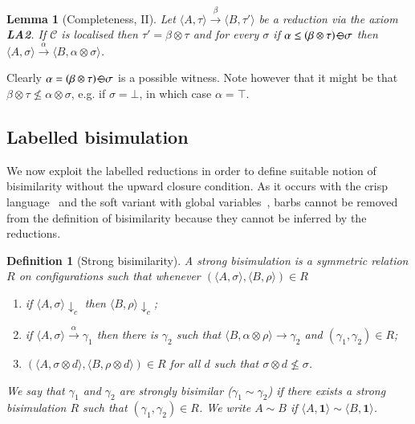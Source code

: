 \documentclass[preprint,12pt]{elsarticle}
\newtheorem{definition}{Definition}
\newtheorem{lemma}{Lemma}
\def\C{{\mathcal C}}
\def\monid{{\mathbf 0}}
\def\C{{\mathcal C}}
\def\odiv{\, {\ominus\hspace{-7.7pt} \div} \,}
\def\monid{\mathbf{1}}
\begin{document}
\begin{lemma}[Completeness, II]
	\label{LA2}
	Let $\langle A, \tau \rangle \xrightarrow{\beta} \langle B, \tau' \rangle$ be a reduction 
	via the axiom {\bf LA2}. If $\C$ is localised then $\tau' = \beta \otimes \tau$
	and for every $\sigma$ if $\alpha \leq (\beta \otimes \tau) \odiv \sigma$ then
	$\langle A, \sigma \rangle \xrightarrow{\alpha} \langle B, \alpha \otimes \sigma \rangle$.
\end{lemma}


Clearly $\alpha = (\beta \otimes \tau) \odiv \sigma$ is a possible witness. Note however that 
it might be that $\beta \otimes \tau \not \leq \alpha \otimes \sigma$,
e.g. if $\sigma = \bot$, in which case $\alpha = \top$.


%




\subsection{Labelled bisimulation}\label{sec:bisimilarity}
We now exploit the labelled reductions in order to define suitable notion of bisimilarity without the upward closure condition.
As it occurs with the crisp language~\cite{pippo} and the soft variant with global variables~\cite{festcatuscia}, 
barbs cannot be removed from the 
definition of bisimilarity because they cannot be inferred by the reductions.

\begin{definition}[Strong bisimilarity]\label{def:strongbis} A strong bisimulation is a symmetric relation $R$ on configurations such that whenever
	$( \langle A, \sigma \rangle,\langle B, \rho \rangle) \in R$
	\begin{enumerate}
		\item if $\langle A, \sigma \rangle \downarrow_c$ then $\langle B, \rho \rangle \downarrow_c$;
		\item if $\langle A, \sigma \rangle \xrightarrow{\alpha} \gamma_1$ then there is $\gamma_2$ such that $\langle B, \alpha \otimes \rho \rangle \to \gamma_2$ 
		and $(\gamma_1, \gamma_2) \in R$;
		\item $(\langle A,\sigma \otimes d\rangle, \langle B,\rho \otimes d \rangle) \in R$ for  all $d$ such that $\sigma \otimes d \not \leq \sigma$. 
	\end{enumerate}
	We say that $\gamma_1$ and $\gamma_2$ are  strongly bisimilar ($\gamma_1  \sim \gamma_2$) if there exists a strong  bisimulation 
	$R$ such that $(\gamma_1 , \gamma_2 ) \in R$. We write $A \sim B$ if $\langle A, \monid \rangle \sim \langle B, \monid \rangle$.
\end{definition}
\end{document}
